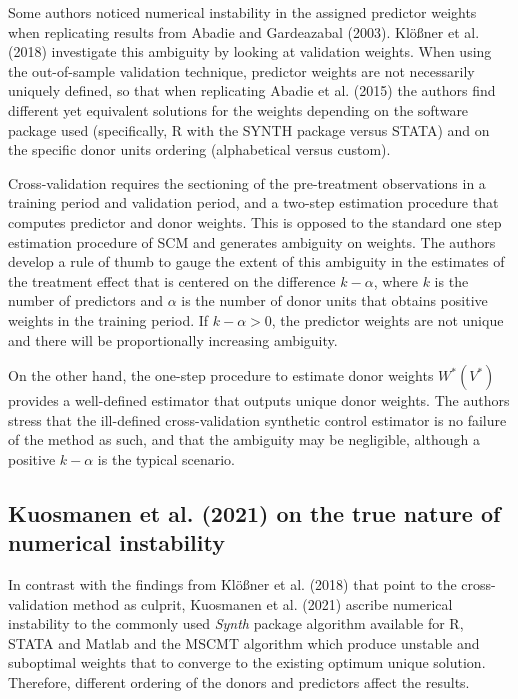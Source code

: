 \documentclass[12pt,a4paper,draft]{article}
\begin{document}
Some authors noticed numerical instability in the assigned predictor weights 
when replicating results from Abadie and Gardeazabal (2003). 
Klößner et al. (2018) investigate this ambiguity by looking at validation weights. 
When using the out-of-sample validation technique, 
predictor weights are not necessarily uniquely defined, so that when replicating 
Abadie et al. (2015) the authors find different yet equivalent solutions 
for the weights depending on the software package used (specifically, R with 
the SYNTH package versus STATA) and on the specific donor units ordering (alphabetical 
versus custom).

Cross-validation requires the sectioning of the pre-treatment observations 
in a training period and validation period, and a two-step estimation procedure 
that computes predictor and donor weights. This is opposed to the standard 
one step estimation procedure of SCM and generates ambiguity on weights. 
The authors develop a rule of thumb to gauge the extent of this ambiguity 
in the estimates of the treatment effect that is centered on the difference 
$k-\alpha$, where $k$ is the number of predictors and $\alpha$ is the number of 
donor units that obtains positive weights in the training period.
If $k-\alpha>0$, the predictor weights are not unique and there will be 
proportionally increasing ambiguity.

On the other hand, the one-step procedure to estimate donor weights $W^*(V^*)$ 
provides a well-defined estimator that outputs unique donor weights. The authors 
stress that the ill-defined cross-validation synthetic control estimator is no 
failure of the method as such, and that the ambiguity may be negligible, although 
a positive $k-\alpha$ is the typical scenario.




\subsection{Kuosmanen et al. (2021) on the true nature of numerical instability}

In contrast with the findings from Klößner et al. (2018) that point to the 
cross-validation method as culprit, Kuosmanen et al. (2021) ascribe numerical 
instability to the commonly used \emph{Synth} package algorithm available for 
R, STATA and Matlab and the MSCMT algorithm which produce unstable and suboptimal 
weights that to converge to the existing optimum unique solution. 
Therefore, different ordering of the donors and predictors affect the results. 
\end{document}
